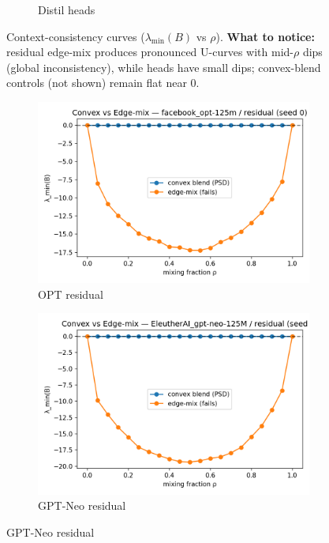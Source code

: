 \documentclass[11pt]{article}
\newcommand{\1}{\mathbf{1}}
\begin{document}
\begin{figure}[t]
\begin{subfigure}[t]{0.32\textwidth}
\caption{Distil heads}
\end{subfigure}
\caption{Context-consistency curves ($\lambda_{\min}(B)$ vs $\rho$). \textbf{What to notice:} residual edge-mix produces pronounced U-curves with mid-$\rho$ dips (global inconsistency), while heads have small dips; convex-blend controls (not shown) remain flat near 0.}
\label{fig:curves}
\end{figure}

\begin{figure}[t]
\centering
\begin{subfigure}[t]{0.48\textwidth}
\includegraphics[width=\linewidth]{figs/control_convex_vs_edge_mix_facebook_opt-125m_residual_seed0.png}
\caption{OPT residual}
\end{subfigure}\hfill
\begin{subfigure}[t]{0.48\textwidth}
\includegraphics[width=\linewidth]{figs/control_convex_vs_edge_mix_EleutherAI_gpt-neo-125M_residual_seed0.png}
\caption{GPT-Neo residual}
\end{subfigure}


\end{figure}
\end{document}
